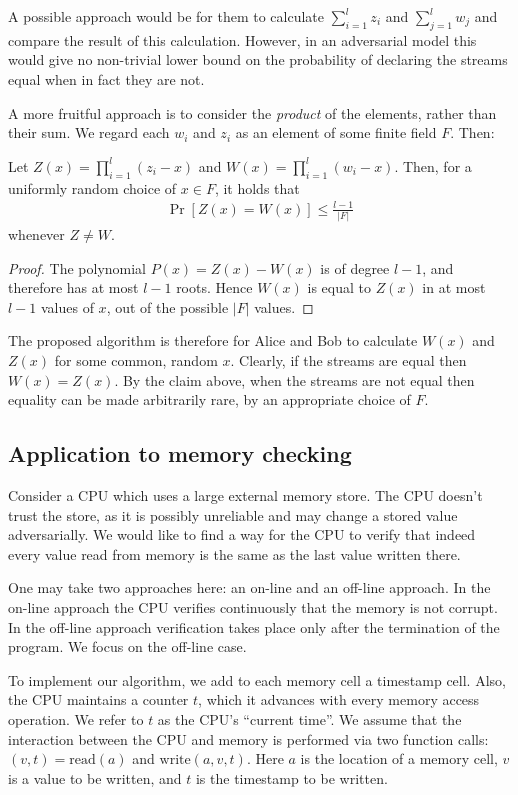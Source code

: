 \documentclass{article}
\begin{document}
A possible approach would be for them to calculate $\sum_{i=1}^l z_i$
and $\sum_{j=1}^l w_j$ and compare the result of this
calculation. However, in an adversarial model this would give no
non-trivial lower bound on the probability of declaring the streams
equal when in fact they are not.

A more fruitful approach is to consider the {\em product} of the
elements, rather than their sum. We regard each $w_i$ and $z_i$ as an
element of some finite field $F$. Then:
\begin{claim}
  Let $Z(x)=\prod_{i=1}^l(z_i-x)$ and $W(x)=\prod_{i=1}^l(w_i-x)$. Then, for a
  uniformly random choice of $x \in F$, it holds that
  \begin{align*}
    \Pr[Z(x)=W(x)] \leq \frac{l-1}{|F|}
  \end{align*}
  whenever $Z \neq W$.
\end{claim}
\begin{proof}
  The polynomial $P(x)=Z(x)-W(x)$ is of degree $l-1$, and therefore
  has at most $l-1$ roots. Hence $W(x)$ is equal to $Z(x)$ in at most
  $l-1$ values of $x$, out of the possible $|F|$ values.
\end{proof}

The proposed algorithm is therefore for Alice and Bob to calculate
$W(x)$ and $Z(x)$ for some common, random $x$. Clearly, if the streams
are equal then $W(x) = Z(x)$. By the claim above, when the streams are
not equal then equality can be made arbitrarily rare, by an
appropriate choice of $F$.


\subsection{Application to memory checking}

Consider a CPU which uses a large external memory store. The CPU
doesn't trust the store, as it is possibly unreliable and may change a
stored value adversarially. We would like to find a way for the CPU to
verify that indeed every value read from memory is the same as the
last value written there.

One may take two approaches here: an on-line and an off-line
approach. In the on-line approach the CPU verifies continuously that
the memory is not corrupt. In the off-line approach verification takes
place only after the termination of the program. We focus on the
off-line case.

To implement our algorithm, we add to each memory cell a timestamp
cell. Also, the CPU maintains a counter $t$, which it advances with
every memory access operation. We refer to $t$ as the CPU's ``current
time''. We assume that the interaction between the CPU and memory is
performed via two function calls: $(v,t) = \mathrm{read}(a)$ and
$\mathrm{write}(a,v,t)$. Here $a$ is the location of a memory cell,
$v$ is a value to be written, and $t$ is the timestamp to be written.
\end{document}
